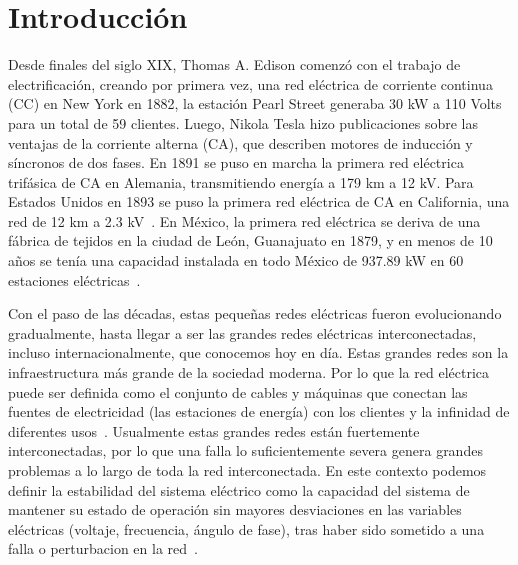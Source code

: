 
\chapter{Introducción}

Desde finales del siglo XIX, Thomas A. Edison comenzó con el trabajo de electrificación, creando por primera vez, una red eléctrica de corriente continua (CC) en New York en 1882, la estación Pearl Street generaba 30 kW a 110 Volts para un total de 59 clientes. Luego, Nikola Tesla hizo publicaciones sobre las ventajas de la corriente alterna (CA), que describen motores de inducción y síncronos de dos fases. En 1891 se puso en marcha la primera red eléctrica trifásica de CA en Alemania, transmitiendo energía a 179 km a 12 kV. Para Estados Unidos en 1893 se puso la primera red eléctrica de CA en California, una red de 12 km a 2.3 kV~\cite{Glover2017}. En México, la primera red eléctrica se deriva de una fábrica de tejidos en la ciudad de León, Guanajuato en 1879, y en menos de 10 años se tenía una capacidad instalada en todo México de 937.89 kW en 60 estaciones eléctricas~\cite{Garza1994}.

Con el paso de las décadas, estas pequeñas redes eléctricas fueron evolucionando gradualmente, hasta llegar a ser las grandes redes eléctricas interconectadas, incluso internacionalmente, que conocemos hoy en día. Estas grandes redes son la infraestructura más grande de la sociedad moderna. Por lo que la red eléctrica puede ser definida como el conjunto de cables y máquinas que conectan las fuentes de electricidad (las estaciones de energía) con los clientes y la infinidad de diferentes usos~\cite{Amin2008}. Usualmente estas grandes redes están fuertemente interconectadas, por lo que una falla lo suficientemente severa genera grandes problemas a lo largo de toda la red interconectada. En este contexto podemos definir la estabilidad del sistema eléctrico como la capacidad del sistema de mantener su estado de operación sin mayores desviaciones en las variables eléctricas (voltaje, frecuencia, ángulo de fase), tras haber sido sometido a una falla o perturbacion en la red~\cite{Kundur2004, Hatziargyriou2021}.

